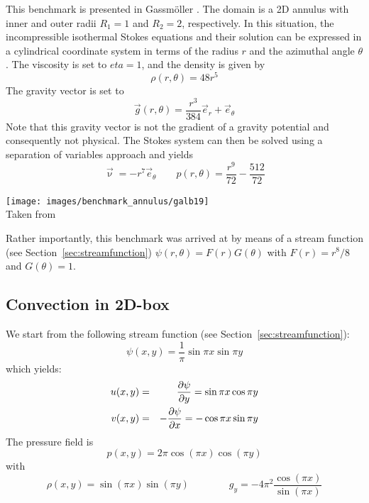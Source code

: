 This benchmark is presented in Gass{m\"o}ller \etal \cite{galb19}.
The domain is a 2D annulus with inner and outer radii $R_1=1$ and $R_2=2$, respectively.
In this situation, the incompressible isothermal Stokes equations and their solution
can be expressed in a cylindrical coordinate system in terms of the radius $r$ and the
azimuthal angle $\theta$. The viscosity is set to $eta=1$, and the density is given by
\begin{equation}
\rho(r,\theta)=48r^5
\end{equation}
The gravity vector is set to 
\begin{equation}
\vec{g}(r,\theta)=\frac{r^3}{384} \vec{e}_r + \vec{e}_\theta
\end{equation}
Note that this gravity vector is not the gradient of a gravity potential
and consequently not physical.
The Stokes system can then be solved using a separation of variables
approach and yields
\begin{equation}
\vec{\upnu}=-r^7 \vec{e}_\theta
\quad\quad
p(r,\theta)=\frac{r^9}{72}-\frac{512}{72}
\end{equation}
\begin{center}
\texttt{[image: images/benchmark\_annulus/galb19]}\\
{\captionfont Taken from \cite{galb19}}
\end{center}
Rather importantly, this benchmark was arrived at by means of a stream function (see Section~\ref{sec:streamfunction}) 
$\psi(r,\theta)=F(r)G(\theta)$ with $F(r)=r^8/8$ and $G(\theta)=1$.

\subsection{Convection in 2D-box} \label{sec:citb}

We start from the following stream function (see Section~\ref{sec:streamfunction}):
\begin{equation}
\psi(x,y)=\frac{1}{\pi} \sin \pi x \sin \pi y
\end{equation}
which yields:
\begin{eqnarray}
u(x,y)&=&\frac{\partial \psi}{\partial y} = \sin \pi x \cos \pi y \nonumber\\
v(x,y)&=&-\frac{\partial \psi}{\partial x} = - \cos \pi x \sin \pi y
\end{eqnarray}
The pressure field is 
\begin{equation}
p(x,y) = 2\pi \cos (\pi x) \cos (\pi y) 
\end{equation}
with 
\begin{equation}
\rho(x,y)=\sin(\pi x) \sin (\pi y)
\qquad\qquad
g_y = -4\pi ^2 \frac{\cos (\pi x)}{\sin (\pi x)}
\end{equation}


